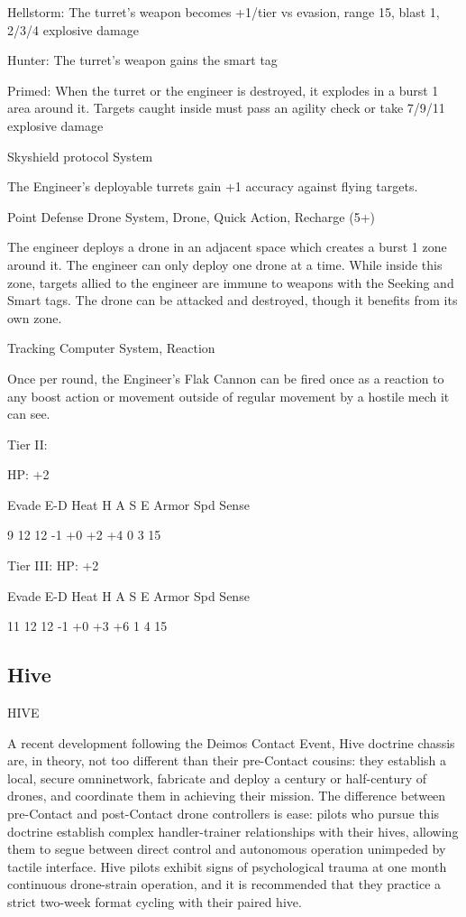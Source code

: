          Hellstorm: The turret’s weapon becomes +1/tier vs evasion, range 15, blast 1, 2/3/4  
         explosive damage
 
         Hunter: The turret’s weapon gains the smart tag
 
         Primed: When the turret or the engineer is destroyed, it explodes in a burst 1 area around  
         it. Targets caught inside must pass an agility check or take 7/9/11 explosive damage
 

Skyshield protocol  
System
 
The Engineer’s deployable turrets gain +1 accuracy against flying targets.
 

Point Defense Drone  
System, Drone, Quick Action, Recharge (5+)
 
The engineer deploys a drone in an adjacent space which creates a burst 1 zone around it. The  
engineer can only deploy one drone at a time. While inside this zone, targets allied to the  
engineer are immune to weapons with the Seeking and Smart tags. The drone can be attacked  
and destroyed, though it benefits from its own zone.
 

Tracking Computer  
System, Reaction
 
Once per round, the Engineer’s Flak Cannon can be fired once as a reaction to any boost action  
or movement outside of regular movement by a hostile mech it can see.
 

Tier II:
 
HP: +2
 

          Evade    E-D    Heat    H    A     S    E       Armor        Spd      Sense 

          9        12     12      -1   +0    +2   +4       0           3        15 

Tier III:  
HP: +2
 

          Evade    E-D    Heat    H    A     S    E       Armor        Spd      Sense 

          11       12     12      -1   +0    +3   +6       1           4        15 

                                                                                                             
\subsection{Hive}

                                                   HIVE  

A recent development following the Deimos Contact Event, Hive doctrine chassis are, in theory,  
not too different than their pre-Contact cousins: they establish a local, secure omninetwork,  
fabricate and deploy a century or half-century of drones, and coordinate them in achieving their  
mission. The difference between pre-Contact and post-Contact drone controllers is ease: pilots  
who pursue this doctrine establish complex handler-trainer relationships with their hives, allowing  
them to segue between direct control and autonomous operation unimpeded by tactile interface.  
Hive pilots exhibit signs of psychological trauma at one month continuous drone-strain operation,  
and it is recommended that they practice a strict two-week format cycling with their paired hive.   

